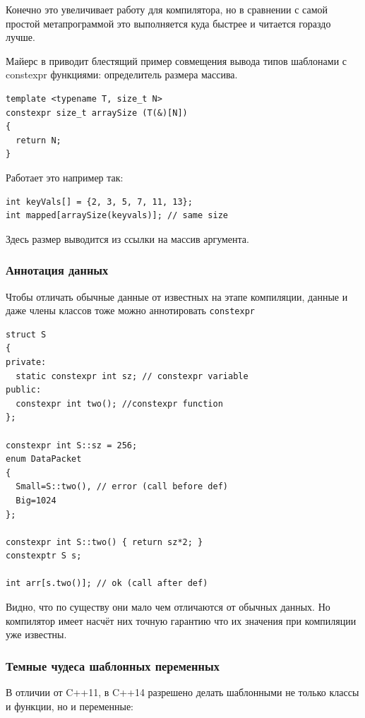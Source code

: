\documentclass[a4paper,12pt,oneside]{article}
\begin{document}
Конечно это увеличивает работу для компилятора, но в сравнении с самой простой метапрограммой это выполняется куда быстрее и читается гораздо лучше.

Майерс в \cite{effmoderncpp} приводит блестящий пример совмещения вывода типов шаблонами с constexpr функциями: определитель размера массива.

\begin{lstlisting}
template <typename T, size_t N>
constexpr size_t arraySize (T(&)[N]) 
{
  return N;
}
\end{lstlisting}

Работает это например так:

\begin{lstlisting}
int keyVals[] = {2, 3, 5, 7, 11, 13};
int mapped[arraySize(keyvals)]; // same size
\end{lstlisting}

Здесь размер выводится из ссылки на массив аргумента.

\subsubsection{Аннотация данных}\label{Constexpr:data}

Чтобы отличать обычные данные от известных на этапе компиляции, данные и даже члены классов тоже можно аннотировать \lstinline!constexpr!

\begin{lstlisting}
struct S
{
private:
  static constexpr int sz; // constexpr variable
public:
  constexpr int two(); //constexpr function
};

constexpr int S::sz = 256;
enum DataPacket
{
  Small=S::two(), // error (call before def)  
  Big=1024
};

constexpr int S::two() { return sz*2; }
constexptr S s;

int arr[s.two()]; // ok (call after def)
\end{lstlisting}

Видно, что по существу они мало чем отличаются от обычных данных. Но компилятор имеет насчёт них точную гарантию что их значения при компиляции уже известны.

\subsubsection{Темные чудеса шаблонных переменных}\label{Constexpr:templatevars}

В отличии от C++11, в C++14 разрешено делать шаблонными не только классы и функции, но и переменные:
\end{document}
